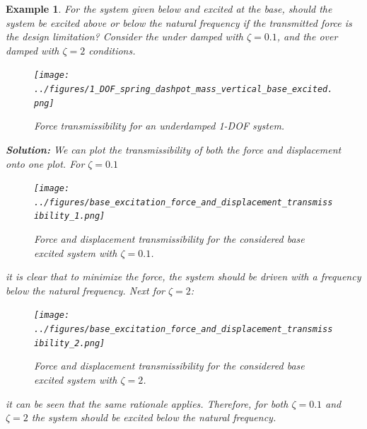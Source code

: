 \documentclass[12pt,letter]{article}
\newtheorem{ex}{Example}
\numberwithin{ex}{section} %
\newenvironment{example}{\begin{mdframed}[middlelinewidth=0.5mm]\begin{ex}\normalfont}{\end{ex}\end{mdframed}}
\numberwithin{re}{section} %
\begin{document}
				\begin{example}
					
					For the system given below and excited at the base, should the system be excited above or below the natural frequency if the transmitted force is the design limitation? Consider the under damped with $\zeta=0.1$, and the over damped with $\zeta=2$ conditions. 
		
					\begin{figure}[H]
						\centering
						\texttt{[image: ../figures/1\_DOF\_spring\_dashpot\_mass\_vertical\_base\_excited.png]}
						\caption{Force transmissibility for an underdamped 1-DOF system.}
					\end{figure}		
				
					\noindent\textbf{Solution:} We can plot the transmissibility of both the force and displacement onto one plot. For $\zeta=0.1$
					\begin{figure}[H]
						\centering
						\texttt{[image: ../figures/base\_excitation\_force\_and\_displacement\_transmissibility\_1.png]}
						\caption{Force and displacement transmissibility for the considered base excited system with $\zeta=0.1$.}
					\end{figure}
					it is clear that to minimize the force, the system should be driven with a frequency below the natural frequency. Next for  $\zeta=2$:
					\begin{figure}[H]
						\centering
						\texttt{[image: ../figures/base\_excitation\_force\_and\_displacement\_transmissibility\_2.png]}
						\caption{Force and displacement transmissibility for the considered base excited system with $\zeta=2$.}
					\end{figure}			
					it can be seen that the same rationale applies. Therefore, for both $\zeta=0.1$ and $\zeta=2$ the system should be excited below the natural frequency.
				
				\end{example}
	
			
							
\end{document}
